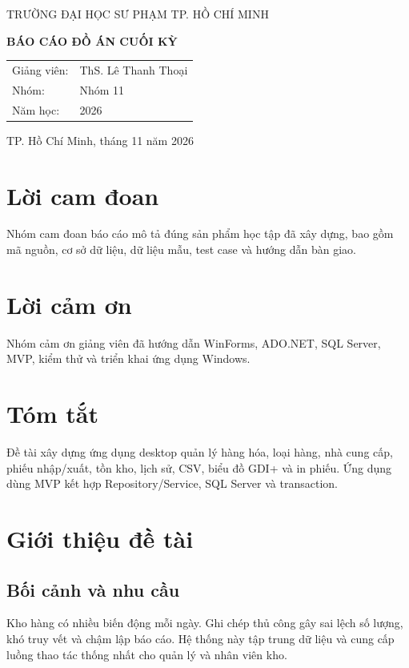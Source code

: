 \documentclass[12pt,a4paper]{report}
\begin{document}
\begin{titlepage}
\centering
{\Large TRƯỜNG ĐẠI HỌC SƯ PHẠM TP. HỒ CHÍ MINH\par}
\vspace{0.4cm}{\large KHOA CÔNG NGHỆ THÔNG TIN\par}\vfill
{\Huge\bfseries BÁO CÁO ĐỒ ÁN CUỐI KỲ\par}
\vspace{0.5cm}{\LARGE\bfseries HỆ THỐNG QUẢN LÝ KHO HÀNG\par}
\vspace{0.4cm}{\Large Môn: Lập trình trên Windows\par}\vfill
\begin{tabular}{ll}
Giảng viên: & ThS. Lê Thanh Thoại\\
Nhóm: & Nhóm 11\\
Năm học: & 2026
\end{tabular}\vfill
TP. Hồ Chí Minh, tháng 11 năm 2026
\end{titlepage}
\chapter*{Lời cam đoan}
Nhóm cam đoan báo cáo mô tả đúng sản phẩm học tập đã xây dựng, bao gồm mã nguồn,
cơ sở dữ liệu, dữ liệu mẫu, test case và hướng dẫn bàn giao.
\chapter*{Lời cảm ơn}
Nhóm cảm ơn giảng viên đã hướng dẫn WinForms, ADO.NET, SQL Server, MVP, kiểm thử
và triển khai ứng dụng Windows.
\chapter*{Tóm tắt}
Đề tài xây dựng ứng dụng desktop quản lý hàng hóa, loại hàng, nhà cung cấp,
phiếu nhập/xuất, tồn kho, lịch sử, CSV, biểu đồ GDI+ và in phiếu. Ứng dụng dùng
MVP kết hợp Repository/Service, SQL Server và transaction.
\tableofcontents
\listoftables
\clearpage{}

\chapter{Giới thiệu đề tài}
\section{Bối cảnh và nhu cầu}
Kho hàng có nhiều biến động mỗi ngày. Ghi chép thủ công gây sai lệch số lượng,
khó truy vết và chậm lập báo cáo. Hệ thống này tập trung dữ liệu và cung cấp
luồng thao tác thống nhất cho quản lý và nhân viên kho.
\end{document}
